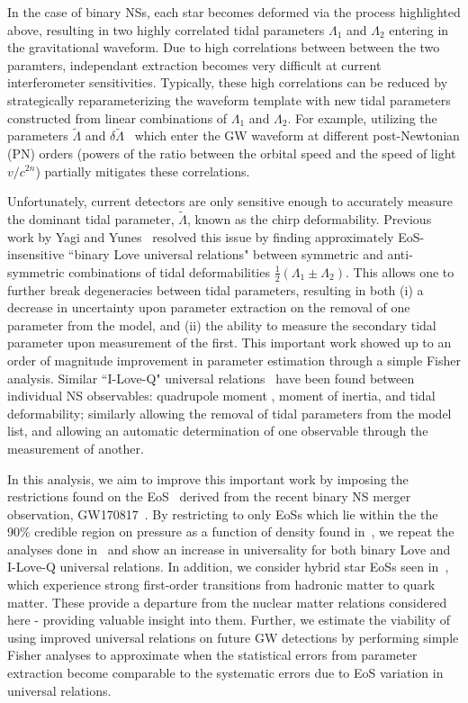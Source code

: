 \documentclass[prd,twocolumn,nofootinbib,superscriptaddress,amsmath,amssymb]{revtex4-1}
\begin{document}
In the case of binary NSs, each star becomes deformed via the process highlighted above, resulting in two highly correlated tidal parameters $\Lambda_1$ and $\Lambda_2$ entering in the gravitational waveform.
Due to high correlations between between the two paramters, independant extraction becomes very difficult at current interferometer sensitivities.
Typically, these high correlations can be reduced by strategically reparameterizing the waveform template with new tidal parameters constructed from linear combinations of $\Lambda_1$ and $\Lambda_2$.
For example, utilizing the parameters $\tilde{\Lambda}$ and $\delta \tilde{\Lambda}$~\cite{hinderer-love,Flanagan2008} which enter the GW waveform at different post-Newtonian (PN) orders (powers of the ratio between the orbital speed and the speed of light $v/c^{2n}$) partially mitigates these correlations.

Unfortunately, current detectors are only sensitive enough to accurately measure the dominant tidal parameter, $\tilde{\Lambda}$, known as the chirp deformability.
Previous work by Yagi and Yunes~\cite{Yagi:binLove} resolved this issue by finding approximately EoS-insensitive ``binary Love universal relations" between symmetric and anti-symmetric combinations of tidal deformabilities $\frac{1}{2}(\Lambda_1 \pm \Lambda_2)$.
This allows one to further break degeneracies between tidal parameters, resulting in both (i) a decrease in uncertainty upon parameter extraction on the removal of one parameter from the model, and (ii) the ability to measure the secondary tidal parameter upon measurement of the first.  
This important work showed up to an order of magnitude improvement in parameter estimation through a simple Fisher analysis.
Similar ``I-Love-Q" universal relations~\cite{Yagi:ILQ} have been found between individual NS observables: quadrupole moment , moment of inertia, and tidal deformability; similarly allowing the removal of tidal parameters from the model list, and allowing an automatic determination of one observable through the measurement of another.

In this analysis, we aim to improve this important work by imposing the restrictions found on the EoS~\cite{LIGO:posterior} derived from the recent binary NS merger observation, GW170817~\cite{TheLIGOScientific:2017qsa}.
By restricting to only EoSs which lie within the the 90\% credible region on pressure as a function of density found in~\cite{LIGO:posterior}, we repeat the analyses done in~\cite{Yagi:binLove,Yagi:ILQ} and show an increase in universality for both binary Love and I-Love-Q universal relations.
In addition, we consider hybrid star EoSs seen in~\cite{Paschalidis2018}, which experience strong first-order transitions from hadronic matter to quark matter.
These provide a departure from the nuclear matter relations considered here - providing valuable insight into them.
Further, we estimate the viability of using improved universal relations on future GW detections by performing simple Fisher analyses to approximate when the statistical errors from parameter extraction become comparable to the systematic errors due to EoS variation in universal relations.
\end{document}
